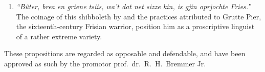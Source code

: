 \documentclass[twoside,openright,11pt]{book}
\begin{document}
\begin{adjustwidth}{-1.25em}{-0.25em}
\begin{enumerate}
\item \textit{``Bûter, brea en griene tsiis, wa’t dat net sizze kin, is gjin oprjochte Fries.''}\\The coinage of this shibboleth by and the practices attributed to Grutte Pier, the sixteenth-century Frisian warrior, position him as a proscriptive linguist of a rather extreme variety.


\end{enumerate}
\end{adjustwidth}



\bigskip
\begin{center}
\footnotesize
These propositions are regarded as opposable and defendable, and have been approved as such by the promotor prof.\ dr.\ R.\ H.\ Bremmer Jr.
\end{center}

\end{document}
